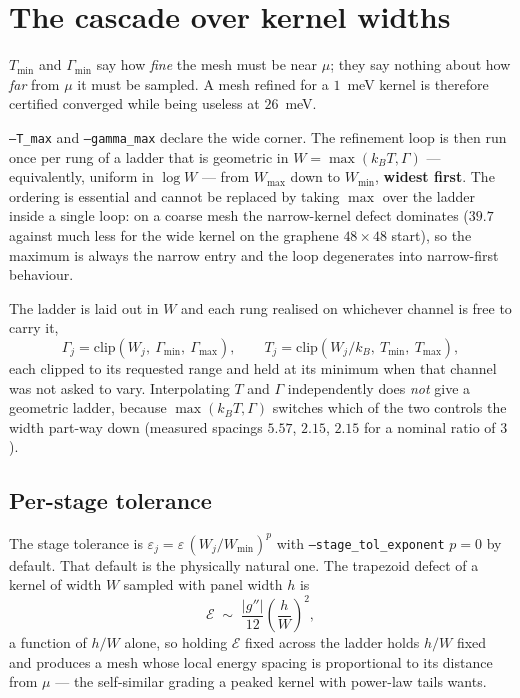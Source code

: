 \documentclass[11pt,a4paper]{article}
\newcommand{\code}[1]{\texttt{#1}}
\begin{document}
\section{The cascade over kernel widths}
\label{sec:cascade}

$T_\text{min}$ and $\Gamma_\text{min}$ say how \emph{fine} the mesh must be
near $\mu$; they say nothing about how \emph{far} from $\mu$ it must be
sampled. A mesh refined for a $1$~meV kernel is therefore certified converged
while being useless at $26$~meV.

\code{--T\_max} and \code{--gamma\_max} declare the wide corner. The
refinement loop is then run once per rung of a ladder that is geometric in
$W=\max(k_BT,\Gamma)$ --- equivalently, uniform in $\log W$ --- from
$W_\text{max}$ down to $W_\text{min}$, \textbf{widest first}. The ordering is
essential and cannot be replaced by taking $\max$ over the ladder inside a
single loop: on a coarse mesh the narrow-kernel defect dominates ($39.7$
against much less for the wide kernel on the graphene $48\times48$ start), so
the maximum is always the narrow entry and the loop degenerates into
narrow-first behaviour.

The ladder is laid out in $W$ and each rung realised on whichever channel is
free to carry it,
\begin{equation}
  \Gamma_j = \mathrm{clip}(W_j,\ \Gamma_\text{min},\ \Gamma_\text{max}),
  \qquad
  T_j = \mathrm{clip}(W_j/k_B,\ T_\text{min},\ T_\text{max}),
\end{equation}
each clipped to its requested range and held at its minimum when that channel
was not asked to vary. Interpolating $T$ and $\Gamma$ independently does
\emph{not} give a geometric ladder, because $\max(k_BT,\Gamma)$ switches which
of the two controls the width part-way down (measured spacings $5.57$, $2.15$,
$2.15$ for a nominal ratio of $3$).

\subsection{Per-stage tolerance}

The stage tolerance is $\varepsilon_j = \varepsilon\,(W_j/W_\text{min})^p$
with \code{--stage\_tol\_exponent} $p=0$ by default. That default is the
physically natural one. The trapezoid defect of a kernel of width $W$ sampled
with panel width $h$ is
\begin{equation}
  \mathcal{E} \;\sim\; \frac{|g''|}{12}\left(\frac{h}{W}\right)^{2},
  \label{eq:hoverW}
\end{equation}
a function of $h/W$ alone, so holding $\mathcal{E}$ fixed across the ladder
holds $h/W$ fixed and produces a mesh whose local energy spacing is
proportional to its distance from $\mu$ --- the self-similar grading a peaked
kernel with power-law tails wants.
\end{document}
